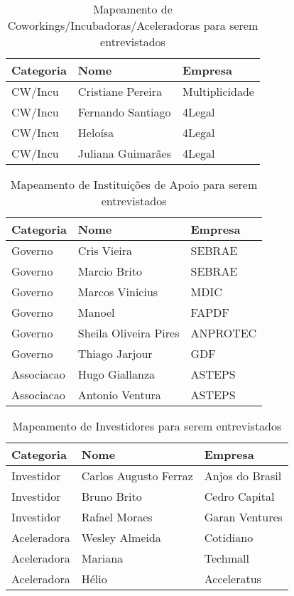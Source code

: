 \begin{apendicesenv}
\begin{table}[!htb]
	\centering
	\begin{tabular}{ | p{3cm} | p{8cm} | p{4cm} | }
		\hline
		Categoria & Nome & Empresa \\ \hline
		CW/Incu & Cristiane Pereira & Multiplicidade \\ \hline
		CW/Incu & Fernando Santiago & 4Legal \\ \hline
		CW/Incu & Heloísa & 4Legal \\ \hline
		CW/Incu & Juliana Guimarães & 4Legal \\ \hline
	\end{tabular}
	\caption{Mapeamento de Coworkings/Incubadoras/Aceleradoras para serem entrevistados}
	\label{table:sugestao_de_coworkings_para_entrevista}
\end{table}

\begin{table}[!htb]
	\centering
	\begin{tabular}{ | p{3cm} | p{8cm} | p{4cm} | }
		\hline
		Categoria & Nome & Empresa \\ \hline
		Governo & Cris Vieira & SEBRAE \\ \hline
		Governo & Marcio Brito & SEBRAE \\ \hline
		Governo & Marcos Vinicius & MDIC \\ \hline
		Governo & Manoel & FAPDF \\ \hline
		Governo & Sheila Oliveira Pires & ANPROTEC \\ \hline
		Governo & Thiago Jarjour & GDF \\ \hline
		Associacao & Hugo Giallanza & ASTEPS \\ \hline
		Associacao & Antonio Ventura & ASTEPS \\ \hline

	\end{tabular}
	\caption{Mapeamento de Instituições de Apoio para serem entrevistados}
	\label{table:sugestao_de_instituicoes_para_entrevista}
\end{table}

\begin{table}[!htb]
	\centering
	\begin{tabular}{ | p{3cm} | p{8cm} | p{4cm} | }
		\hline
		Categoria & Nome & Empresa \\ \hline
		Investidor & Carlos Augusto Ferraz & Anjos do Brasil \\ \hline
		Investidor & Bruno Brito & Cedro Capital \\ \hline
		Investidor & Rafael Moraes & Garan Ventures \\ \hline
		Aceleradora & Wesley Almeida & Cotidiano \\ \hline
		Aceleradora & Mariana & Techmall \\ \hline
		Aceleradora & Hélio & Acceleratus \\ \hline	
	\end{tabular}
	\caption{Mapeamento de Investidores para serem entrevistados}
	\label{table:sugestao_de_investidores_para_entrevista}
\end{table}


\end{apendicesenv}
